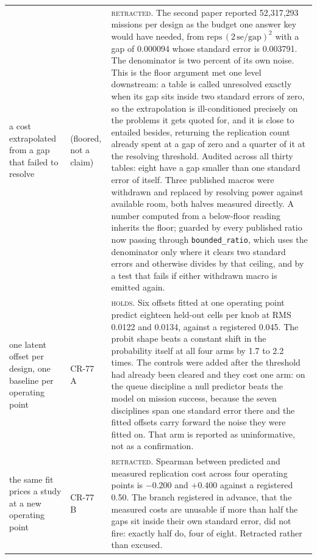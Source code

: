 \begin{tabular}{@{}p{}p{}p{}@{}}
a cost extrapolated from a gap that failed to resolve & (floored, not a claim) & \textsc{retracted}. The second paper reported 52{,}317{,}293 missions per design as the budget one answer key would have needed, from $\mathrm{reps}\,(2\,\mathrm{se}/\mathrm{gap})^2$ with a gap of 0.000094 whose standard error is 0.003791. The denominator is two percent of its own noise. This is the floor argument met one level downstream: a table is called unresolved exactly when its gap sits inside two standard errors of zero, so the extrapolation is ill-conditioned precisely on the problems it gets quoted for, and it is close to entailed besides, returning the replication count already spent at a gap of zero and a quarter of it at the resolving threshold. Audited across all thirty tables: eight have a gap smaller than one standard error of itself. Three published macros were withdrawn and replaced by resolving power against available room, both halves measured directly. A number computed from a below-floor reading inherits the floor; guarded by every published ratio now passing through \texttt{bounded\_ratio}, which uses the denominator only where it clears two standard errors and otherwise divides by that ceiling, and by a test that fails if either withdrawn macro is emitted again. \\
one latent offset per design, one baseline per operating point & CR-77 A & \textsc{holds}. Six offsets fitted at one operating point predict eighteen held-out cells per knob at RMS 0.0122 and 0.0134, against a registered 0.045. The probit shape beats a constant shift in the probability itself at all four arms by 1.7 to 2.2 times. The controls were added after the threshold had already been cleared and they cost one arm: on the queue discipline a null predictor beats the model on mission success, because the seven disciplines span one standard error there and the fitted offsets carry forward the noise they were fitted on. That arm is reported as uninformative, not as a confirmation. \\
the same fit prices a study at a new operating point & CR-77 B & \textsc{retracted}. Spearman between predicted and measured replication cost across four operating points is $-0.200$ and $+0.400$ against a registered 0.50. The branch registered in advance, that the measured costs are unusable if more than half the gaps sit inside their own standard error, did not fire: exactly half do, four of eight. Retracted rather than excused. \\
\bottomrule
\end{tabular}
